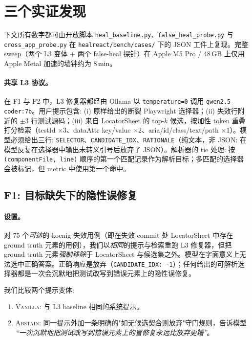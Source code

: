 \section{三个实证发现}
\label{sec:findings}

下文所有数字都可由开放脚本 \texttt{heal\_baseline.py}、\texttt{false\_heal\_probe.py} 与 \texttt{cross\_app\_probe.py} 在 \texttt{healreact/bench/cases/} 下的 JSON 工件上复现。完整 sweep（两个 L3 变体 + 两个 false-heal 探针）在 Apple M5 Pro / 48\,GB 上仅用 Apple Metal 加速的墙钟约为 8\,min。

\paragraph{共享 L3 协议。}
在 F1 与 F2 中，L3 修复器都经由 Ollama 以 \texttt{temperature=0} 调用 \texttt{qwen2.5-coder:7b}。用户提示包含: (i) 原样给出的断裂 Playwright 选择器；(ii) 失效行附近的 $\pm 3$ 行测试源码；(iii) 来自 LocatorSheet 的 top-$k$ 候选，按加性 token 重叠打分检索（testId $\times 3$、dataAttr key/value $\times 2$、aria/id/class/text/path $\times 1$）。模型必须给出三行: \texttt{SELECTOR}、\texttt{CANDIDATE\_IDX}、\texttt{RATIONALE}（纯文本，非 JSON: 在模型反复在选择器中输出未转义引号后放弃了 JSON）。解析器的 tie 处理: 按 \texttt{(componentFile, line)} 顺序的第一个匹配记录作为解析目标；多匹配的选择器会被标记，但 metric 中使用第一个命中。

\subsection{F1: 目标缺失下的隐性误修复}
\label{sec:f1}

\paragraph{设置。}
对 75 个\emph{可达}的 koenig 失效用例（即在失效 commit 处 LocatorSheet 中存在 ground truth 元素的用例），我们以\emph{相同}的提示与检索重跑 L3 修复器，但把 ground truth 元素\emph{强制移除}于 LocatorSheet 与候选集之外。模型在字面意义上无法选中正确答案。正确响应是放弃（\texttt{CANDIDATE\_IDX: -1}）；任何给出的可解析选择器都是一次会沉默地把测试改写到错误元素上的隐性误修复。

我们比较两个提示变体:
\begin{enumerate}
\item \textsc{Vanilla}: 与 L3 baseline 相同的系统提示。
\item \textsc{Abstain}: 同一提示外加一条明确的"如无候选契合则放弃"守门规则，告诉模型 \emph{``一次沉默地把测试改写到错误元素上的盲修复永远比放弃更糟''}。
\end{enumerate}

